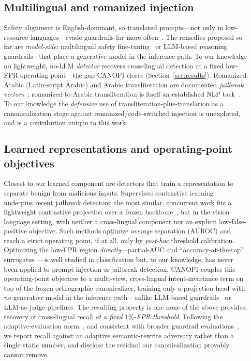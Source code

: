 \subsection{Multilingual and romanized injection}
Safety alignment is English-dominant, so translated prompts---not only in
low-resource languages---evade guardrails far more
often~\cite{yong2023lowresource,deng2024multilingual,babel2025}. The remedies
proposed so far are \emph{model-side}: multilingual safety
fine-tuning~\cite{deng2024multilingual} or LLM-based reasoning
guardrails~\cite{mrguard2025,sealguard2025} that place a generative model in the
inference path. To our knowledge no lightweight, no-LLM \emph{detector} recovers
cross-lingual detection at a fixed low-FPR operating point---the gap CANOPI closes
(Section~\ref{sec:results}). Romanized Arabic (Latin-script Arabic)
and Arabic transliteration are documented \emph{jailbreak vectors}~\cite{arabizi2024};
romanized-to-Arabic transliteration is itself an established NLP
task~\cite{wanlp2020arabizi}. To our knowledge the \emph{defensive} use of
transliteration-plus-translation as a canonicalization stage against
romanized/code-switched injection is unexplored, and is a contribution unique to
this work.

\subsection{Learned representations and operating-point objectives}
Closest to our learned component are detectors that train a representation to
separate benign from malicious inputs. Supervised contrastive
learning~\cite{khosla2020supcon} underpins recent jailbreak detectors; the most
similar, concurrent work fits a lightweight contrastive projection over a frozen
backbone~\cite{rcs2025}, but in the vision--language setting, with neither a
cross-lingual component nor an explicit low-false-positive objective. Such methods
optimize \emph{average} separation (AUROC) and reach a strict operating point, if
at all, only by \emph{post-hoc} threshold calibration. Optimizing the low-FPR
region \emph{directly}---partial-AUC and ``accuracy-at-the-top''
surrogates~\cite{macha2020deeptoppush,zhu2022pauc}---is well studied in
classification but, to our knowledge, has never been applied to prompt-injection
or jailbreak detection. CANOPI couples this operating-point objective to a
multi-view, cross-lingual intent-invariance term on top of the frozen orthographic
canonicalizer, training only a projection head with \emph{no} generative model in
the inference path---unlike LLM-based guardrails~\cite{mrguard2025} or
LLM-as-judge pipelines. The resulting property is one none of the above provides:
recovery of cross-lingual recall \emph{at a fixed $1\%$-FPR threshold}. Following
the adaptive-evaluation norm~\cite{carlini2019eval,attackersecond2025}, and
consistent with broader guardrail evaluations~\cite{sok2025guardrails}, we report
recall against an adaptive semantic-rewrite adversary rather than a single static
number, and disclose the residual our canonicalization provably cannot remove.
